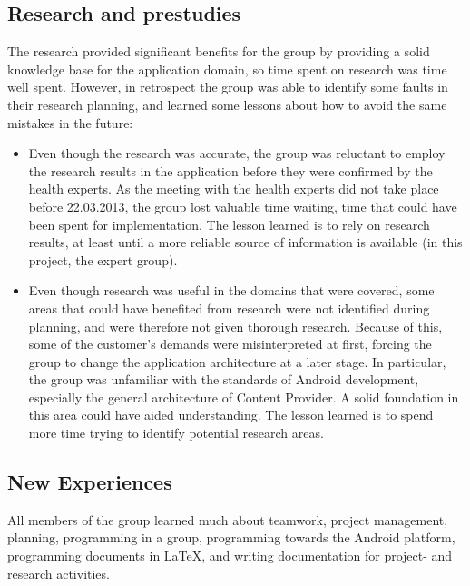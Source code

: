 \subsection{Research and prestudies}
The research provided significant benefits for the group by providing a solid knowledge base for the application domain, so time spent on research was time well spent. However, in retrospect the group was able to identify some faults in their research planning, and learned some lessons about how to avoid the same mistakes in the future:
\begin{itemize}
\item
Even though the research was accurate, the group was reluctant to employ the research results in the application before they were confirmed by the health experts. As the meeting with the health experts did not take place before 22.03.2013, the group lost valuable time waiting, time that could have been spent for implementation. The lesson learned is to rely on research results, at least until a more reliable source of information is available (in this project, the expert group).
\item
Even though research was useful in the domains that were covered, some areas that could have benefited from research were not identified during planning, and were therefore not given thorough research. Because of this, some of the customer's demands were misinterpreted at first, forcing the group to change the application architecture at a later stage. In particular, the group was unfamiliar with the standards of Android development, especially the general architecture of Content Provider. A solid foundation in this area could have aided understanding. The lesson learned is to spend more time trying to identify potential research areas. 
\end{itemize}

\subsection{New Experiences}
All members of the group learned much about teamwork, project management, planning, programming in a group, programming towards the Android platform, programming documents in LaTeX, and writing documentation for project- and research activities.

